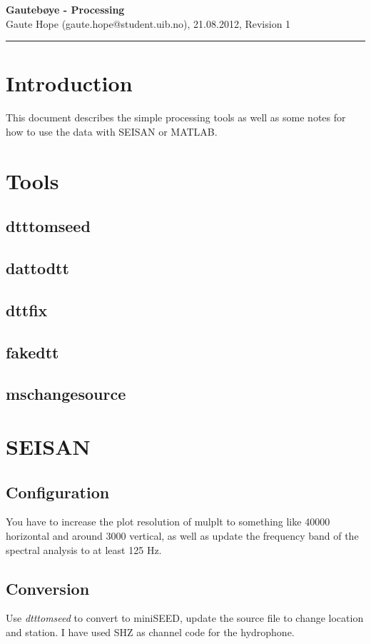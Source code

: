 \documentclass[a4paper]{article}
\newcommand{\makeheading}[2]%
        {\hspace*{-\marginparsep minus \marginparwidth}%
         \begin{minipage}[t]{\textwidth\marginparwidth\marginparsep}%
           {\large \bfseries #1}\\{#2}\\[-0.15\baselineskip]%
                 \rule{\columnwidth}{1pt}%
         \end{minipage}}
\begin{document}
\makeheading{Gautebøye - Processing}{Gaute Hope
(gaute.hope@student.uib.no), 21.08.2012, Revision 1}

\vspace{2em}
\section*{Introduction}
This document describes the simple processing tools as well as some
notes for how to use the data with SEISAN or MATLAB.

\vspace{2em}

\begin{multicols}{2}
  \section{Tools}
  \subsection{dtttomseed}
  \subsection{dattodtt}
  \subsection{dttfix}
  \subsection{fakedtt}
  \subsection{mschangesource}

  \section{SEISAN}
    \subsection{Configuration}
    You have to increase the plot resolution of mulplt to something like
    40000 horizontal and around 3000 vertical, as well as update the
    frequency band of the spectral analysis to at least 125 Hz.

    \subsection{Conversion}
    Use \textit{dtttomseed} to convert to miniSEED, update the source
    file to change location and station. I have used SHZ as channel code
    for the hydrophone.


\end{multicols}
\end{document}

